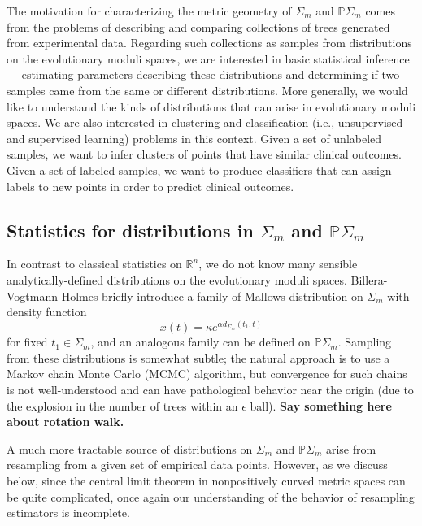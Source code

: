 \documentclass[a4paper,11pt]{article}
\begin{document}
The motivation for characterizing the metric geometry of $\Sigma_m$ and $\mathbb{P}\Sigma_m$ comes from the problems of describing and comparing collections of trees generated from experimental data.
Regarding such collections as samples from distributions on the evolutionary moduli spaces, we are interested in basic statistical inference --- estimating parameters describing these distributions and determining if two samples came from the same or different distributions.
More generally, we would like to understand the kinds of distributions that can arise in evolutionary moduli spaces.
We are also interested in clustering and classification (i.e., unsupervised and supervised learning) problems in this context.
Given a set of unlabeled samples, we want to infer clusters of points that have similar clinical outcomes.
Given a set of labeled samples, we want to produce classifiers that can assign labels to new points in order to predict clinical outcomes.

\subsection{Statistics for distributions in $\Sigma_m$ and $\mathbb{P}\Sigma_m$}

In contrast to classical statistics on $\mathbb{R}^n$, we do not know many sensible analytically-defined distributions on the evolutionary moduli spaces.
Billera-Vogtmann-Holmes briefly introduce a family of Mallows distribution on $\Sigma_m$ with density function
\[
x(t) = \kappa e^{\alpha d_{\Sigma_m}(t_1, t)}
\] 
for fixed $t_1 \in \Sigma_m$, and an analogous family can be defined on $\mathbb{P}\Sigma_m$.
Sampling from these distributions is somewhat subtle; the natural approach is to use a Markov chain Monte Carlo (MCMC) algorithm, but convergence for such chains is not well-understood and can have pathological behavior near the origin (due to the explosion in the number of trees within an $\epsilon$ ball).
{\bf Say something here about rotation walk.}

A much more tractable source of distributions on $\Sigma_m$ and $\mathbb{P}\Sigma_m$ arise from resampling from a given set of empirical data points.
However, as we discuss below, since the central limit theorem in nonpositively curved metric spaces can be quite complicated, once again our understanding of the behavior of resampling estimators is incomplete.
\end{document}
